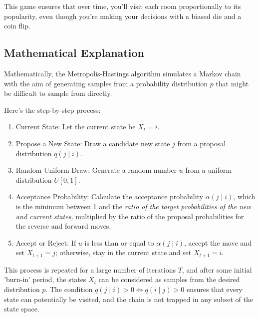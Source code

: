 \documentclass{article}
\begin{document}
This game ensures that over time, you'll visit each room proportionally to its popularity, even though you're making your decisions with a biased die and a coin flip.
\newline
\subsection{Mathematical Explanation}
\newline
Mathematically, the Metropolis-Hastings algorithm simulates a Markov chain with the aim of generating samples from a probability distribution \( p \) that might be difficult to sample from directly.

Here's the step-by-step process:
\begin{enumerate}
    \item Current State: Let the current state be \( X_t = i \).
    \item Propose a New State: Draw a candidate new state \( j \) from a proposal distribution \( q(j \mid i) \).
    \item Random Uniform Draw: Generate a random number \( u \) from a uniform distribution \( U[0,1] \).
\item Acceptance Probability: Calculate the acceptance probability \( \alpha(j \mid i) \), which is the minimum between 1 and the\textit{ ratio of the target probabilities of the new and current states,} multiplied by the ratio of the proposal probabilities for the reverse and forward moves.
\item Accept or Reject: If \( u \) is less than or equal to \( \alpha(j \mid i) \), accept the move and set \( X_{t+1} = j \); otherwise, stay in the current state and set \( X_{t+1} = i \).
\end{enumerate}

This process is repeated for a large number of iterations \( T \), and after some initial 'burn-in' period, the states \( X_t \) can be considered as samples from the desired distribution \( p \). The condition \( q(j \mid i) > 0 \Leftrightarrow q(i \mid j) > 0 \) ensures that every state can potentially be visited, and the chain is not trapped in any subset of the state space.
\newline
\end{document}
